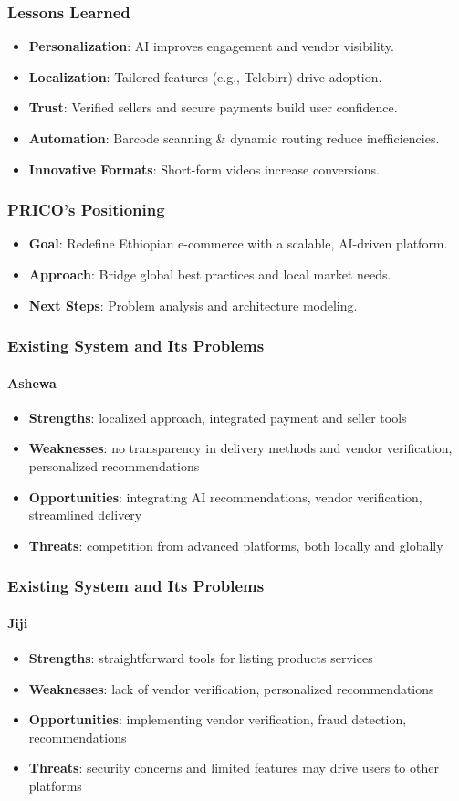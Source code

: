 \documentclass{beamer}
\begin{document}
\begin{frame}
	\frametitle{Lessons Learned}
	\begin{itemize}
		\item \textbf{Personalization}: AI improves engagement and vendor visibility.
		\item \textbf{Localization}: Tailored features (e.g., Telebirr) drive adoption.
		\item \textbf{Trust}: Verified sellers and secure payments build user confidence.
		\item \textbf{Automation}: Barcode scanning \& dynamic routing reduce inefficiencies.
		\item \textbf{Innovative Formats}: Short-form videos increase conversions.
	\end{itemize}
\end{frame}

\begin{frame}
	\frametitle{PRICO’s Positioning}
	\begin{itemize}
		\item \textbf{Goal}: Redefine Ethiopian e-commerce with a scalable, AI-driven platform.
		\item \textbf{Approach}: Bridge global best practices and local market needs.
		\item \textbf{Next Steps}: Problem analysis and architecture modeling.
	\end{itemize}
\end{frame}

\begin{frame}
	\frametitle{Existing System and Its Problems}
	\framesubtitle{Ashewa}
	\begin{itemize}
		\item \textbf{Strengths}: localized approach, integrated payment and
		      seller tools
		\item \textbf{Weaknesses}: no transparency in delivery methods and
		      vendor verification, personalized recommendations
		\item \textbf{Opportunities}: integrating AI recommendations, vendor
		      verification, streamlined delivery
		\item \textbf{Threats}: competition from advanced platforms, both
		      locally and globally
	\end{itemize}
\end{frame}

\begin{frame}
	\frametitle{Existing System and Its Problems}
	\framesubtitle{Jiji}
	\begin{itemize}
		\item \textbf{Strengths}: straightforward tools for listing products
		      services
		\item \textbf{Weaknesses}: lack of vendor verification, personalized
		      recommendations
		\item \textbf{Opportunities}: implementing vendor verification, fraud
		      detection, recommendations
		\item \textbf{Threats}: security concerns and limited features may
		      drive users to other platforms
	\end{itemize}
\end{frame}
\end{document}
